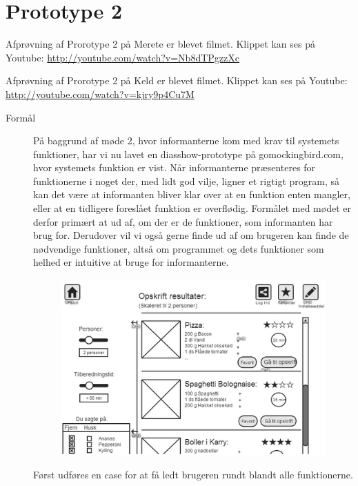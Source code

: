 \section{Prototype 2}
\label{ap:prototype2}

Afprøvning af Prorotype 2 på Merete er blevet filmet. Klippet kan ses på Youtube: \url{http://youtube.com/watch?v=Nb8dTPgzzXc}

Afprøvning af Prorotype 2 på Keld er blevet filmet. Klippet kan ses på Youtube: \url{http://youtube.com/watch?v=kjry9p4Cu7M}

\begin{description}
\item[Formål] På baggrund af møde 2, hvor informanterne kom med krav til systemets funktioner, har vi nu lavet en diasshow-prototype på gomockingbird.com, hvor systemets funktion er vist. Når informanterne præsenteres for funktionerne i noget der, med lidt god vilje, ligner et rigtigt program, så kan det være at informanten bliver klar over at en funktion enten mangler, eller at en tidligere foreslået funktion er overflødig. Formålet med mødet er derfor primært at ud af, om der er de funktioner, som informanten har brug for. Derudover vil vi også gerne finde ud af om brugeren kan finde de nødvendige funktioner, altså om programmet og dets funktioner som helhed er intuitive at bruge for informanterne.

\begin{figure}[H]
\centering
\includegraphics[scale=0.7]{billeder/prototyper/prototype2.png}
\label{fig:prototype2}
\end{figure}

Først udføres en case for at få ledt brugeren rundt blandt alle funktionerne.


\end{description}
